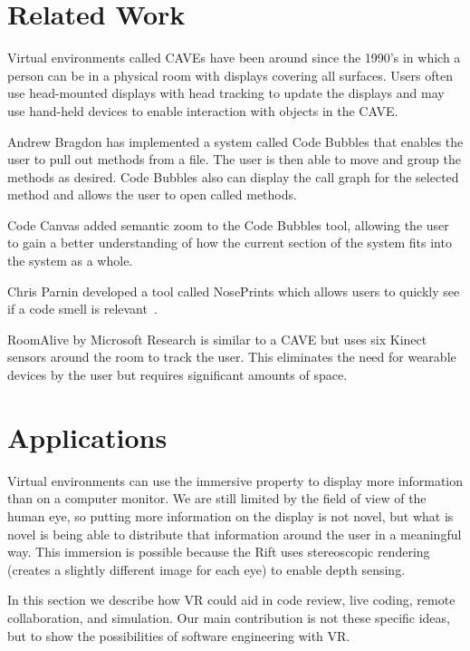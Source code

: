 \documentclass{acm_proc_article-sp}
\begin{document}
\section{Related Work}
Virtual environments called CAVEs have been around since the 1990's in which a person can be in a physical room with displays covering all surfaces.  Users often use head-mounted displays with head tracking to update the displays and may use hand-held devices to enable interaction with objects in the CAVE.

Andrew Bragdon has implemented a system called Code Bubbles that enables the user to pull out methods from a file. The user is then able to move and group the methods as desired.  Code Bubbles also can display the call graph for the selected method and allows the user to open called methods.

Code Canvas added semantic zoom to the Code Bubbles tool, allowing the user to gain a better understanding of how the current section of the system fits into the system as a whole.

Chris Parnin developed a tool called NosePrints which allows users to quickly see if a code smell is relevant~\cite{parnin:Noseprints}.

RoomAlive by Microsoft Research is similar to a CAVE but uses six Kinect sensors around the room to track the user.  This eliminates the need for wearable devices by the user but requires significant amounts of space.

\section{Applications}
Virtual environments can use the immersive property to display more information than on a computer monitor. We are still limited by the field of view of the human eye, so putting more information on the display is not novel, but what is novel is being able to distribute that information around the user in a meaningful way. This immersion is possible because the Rift uses stereoscopic rendering (creates a slightly different image for each eye) to enable depth sensing.

In this section we describe how VR could aid in code review, live coding, remote collaboration, and simulation. Our main contribution is not these specific ideas, but to show the possibilities of software engineering with VR.
\end{document}

